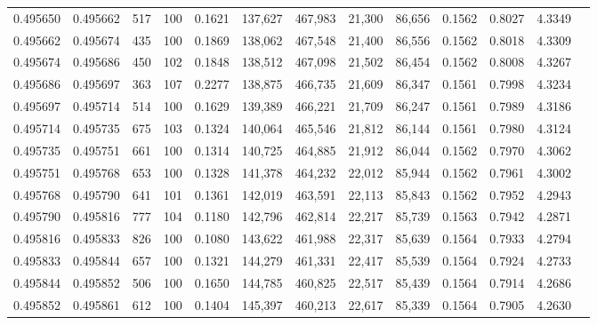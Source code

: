 \begin{tabular}{rrrrrrrrrrrrr}
0.495650 & 0.495662 &   517 & 100 &                                     0.1621 & 137,627 & 467,983 &  21,300 &  86,656 & 0.1562 & 0.8027 & 4.3349 \\
0.495662 & 0.495674 &   435 & 100 &                                     0.1869 & 138,062 & 467,548 &  21,400 &  86,556 & 0.1562 & 0.8018 & 4.3309 \\
0.495674 & 0.495686 &   450 & 102 &                                     0.1848 & 138,512 & 467,098 &  21,502 &  86,454 & 0.1562 & 0.8008 & 4.3267 \\
0.495686 & 0.495697 &   363 & 107 &                                     0.2277 & 138,875 & 466,735 &  21,609 &  86,347 & 0.1561 & 0.7998 & 4.3234 \\
0.495697 & 0.495714 &   514 & 100 &                                     0.1629 & 139,389 & 466,221 &  21,709 &  86,247 & 0.1561 & 0.7989 & 4.3186 \\
0.495714 & 0.495735 &   675 & 103 &                                     0.1324 & 140,064 & 465,546 &  21,812 &  86,144 & 0.1561 & 0.7980 & 4.3124 \\
0.495735 & 0.495751 &   661 & 100 &                                     0.1314 & 140,725 & 464,885 &  21,912 &  86,044 & 0.1562 & 0.7970 & 4.3062 \\
0.495751 & 0.495768 &   653 & 100 &                                     0.1328 & 141,378 & 464,232 &  22,012 &  85,944 & 0.1562 & 0.7961 & 4.3002 \\
0.495768 & 0.495790 &   641 & 101 &                                     0.1361 & 142,019 & 463,591 &  22,113 &  85,843 & 0.1562 & 0.7952 & 4.2943 \\
0.495790 & 0.495816 &   777 & 104 &                                     0.1180 & 142,796 & 462,814 &  22,217 &  85,739 & 0.1563 & 0.7942 & 4.2871 \\
0.495816 & 0.495833 &   826 & 100 &                                     0.1080 & 143,622 & 461,988 &  22,317 &  85,639 & 0.1564 & 0.7933 & 4.2794 \\
0.495833 & 0.495844 &   657 & 100 &                                     0.1321 & 144,279 & 461,331 &  22,417 &  85,539 & 0.1564 & 0.7924 & 4.2733 \\
0.495844 & 0.495852 &   506 & 100 &                                     0.1650 & 144,785 & 460,825 &  22,517 &  85,439 & 0.1564 & 0.7914 & 4.2686 \\
0.495852 & 0.495861 &   612 & 100 &                                     0.1404 & 145,397 & 460,213 &  22,617 &  85,339 & 0.1564 & 0.7905 & 4.2630 \\

\end{tabular}
